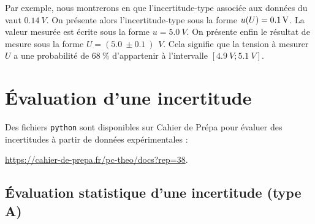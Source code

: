 \begin{remarque}
Par exemple, nous montrerons en  que l’incertitude-type associée aux données du  vaut $\SI{0.14}{V}$. On présente alors l’incertitude-type sous la forme $\incertX u = \SI{0.1}{V}$. La valeur mesurée est écrite sous la forme $u=\SI{5.0}{V}$.  On présente enfin le résultat de mesure sous la forme $U = (\SI{5.0}{} \pm \SI{0.1}{})\,\SI{}{V}$. Cela signifie que la tension à mesurer $U$ a une probabilité de  $\SI{68}{\%}$ d’appartenir à l’intervalle  $[\SI{4.9}{V};\SI{5.1}{V}]$.
\end{remarque}



\section{Évaluation d’une incertitude}

Des fichiers \texttt{python} sont disponibles sur Cahier de Prépa pour évaluer des incertitudes à partir de données expérimentales : 
\begin{center}
  \href{https://cahier-de-prepa.fr/pc-theo/docs?rep=38}{https://cahier-de-prepa.fr/pc-theo/docs?rep=38}.
\end{center}


\subsection{Évaluation statistique d’une incertitude (type A)}

\label{sec:A1}

